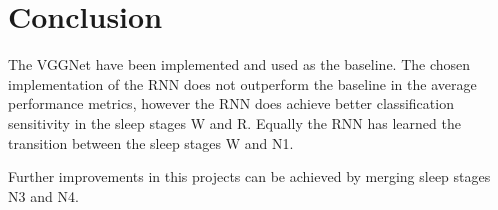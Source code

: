 \section{Conclusion}
\label{sec:conclusion}


The VGGNet have been implemented and used as the baseline. The chosen implementation of the RNN does not outperform the baseline in the average performance metrics, however the RNN does achieve better classification sensitivity in the sleep stages W and R. Equally the RNN has learned the transition between the sleep stages W and N1.

Further improvements in this projects can be achieved by merging sleep stages N3 and N4. 
